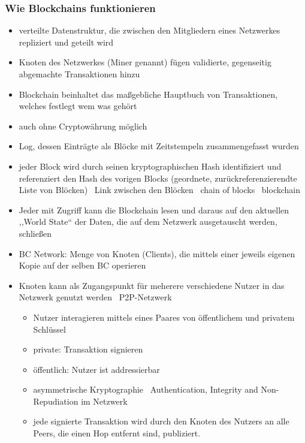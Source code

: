     \subsubsection*{Wie Blockchains funktionieren}
        \begin{itemize}
            \item verteilte Datenstruktur, die zwischen den Mitgliedern eines Netzwerkes repliziert und geteilt wird
            \item Knoten des Netzwerkes (Miner genannt) fügen validierte, gegenseitig abgemachte Transaktionen hinzu
            \item Blockchain beinhaltet das maßgebliche Hauptbuch von Transaktionen, welches festlegt wem was gehört
            \item auch ohne Cryptowährung möglich
            \item Log, dessen Einträgte als Blöcke mit Zeitstempeln zusammengefasst wurden
            \item jeder Block wird durch seinen kryptographischen Hash identifiziert und referenziert den Hash des vorigen Blocks (geordnete, zurückreferenzierendte Liste von Blöcken) \textrightarrow\ Link zwischen den Blöcken \textrightarrow\ chain of blocks \textrightarrow\ blockchain
            \item Jeder mit Zugriff kann die Blockchain lesen und daraus auf den aktuellen ,,World State`` der Daten, die auf dem Netzwerk ausgetauscht werden, schließen
            \item BC Network: Menge von Knoten (Clients), die mittels einer jeweils eigenen Kopie auf der selben BC operieren
            \item Knoten kann als Zugangspunkt für meherere verschiedene Nutzer in das Netzwerk genutzt werden \textrightarrow\ P2P-Netzwerk
                \begin{itemize}
                    \item Nutzer interagieren mittels eines Paares von öffentlichem und privatem Schlüssel
                    \item private: Transaktion signieren
                    \item öffentlich: Nutzer ist addressierbar
                    \item asymmetrische Kryptographie \textrightarrow\ Authentication, Integrity and Non-Repudiation im Netzwerk
                    \item jede signierte Transaktion wird durch den Knoten des Nutzers an alle Peers, die einen Hop entfernt sind, publiziert.

\end{itemize}
\end{itemize}
